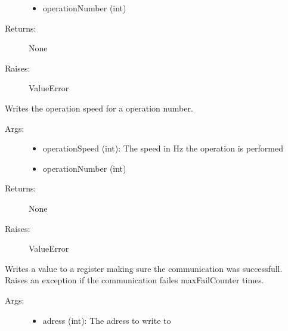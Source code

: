 \documentclass[letterpaper,10pt,english]{sphinxmanual}
\begin{document}
\begin{fulllineitems}
\begin{fulllineitems}
\begin{description}
\begin{itemize}
\item {} 
operationNumber (int)

\end{itemize}

\item[{Returns:}] \leavevmode
None

\item[{Raises:}] \leavevmode
ValueError

\end{description}

\end{fulllineitems}


\begin{fulllineitems}
\label{stepperMotor:stepperMotor.StepperMotor.writeOperationSpeed}
Writes the operation speed for a operation number.
\begin{description}
\item[{Args:}] \leavevmode\begin{itemize}
\item {} 
operationSpeed (int): The speed in Hz the operation is performed

\item {} 
operationNumber (int)

\end{itemize}

\item[{Returns:}] \leavevmode
None

\item[{Raises:}] \leavevmode
ValueError

\end{description}

\end{fulllineitems}


\begin{fulllineitems}
\label{stepperMotor:stepperMotor.StepperMotor.writeRegisterSafe}
Writes a value to a register making sure the communication was successfull.
Raises an exception if the communication failes maxFailCounter times.
\begin{description}
\item[{Args:}] \leavevmode\begin{itemize}
\item {} 
adress (int): The adress to write to


\end{itemize}
\end{description}
\end{fulllineitems}
\end{fulllineitems}
\end{document}
